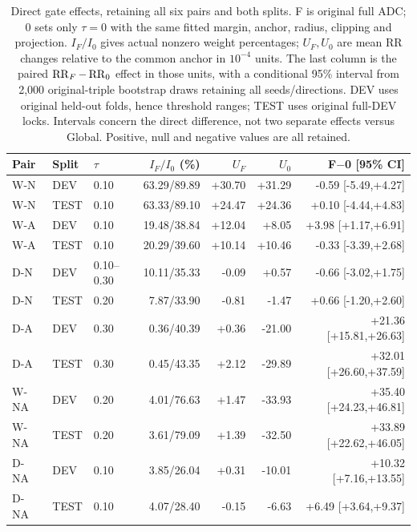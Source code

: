 \begin{table}[htbp]
\centering\footnotesize\setlength{\tabcolsep}{3pt}
\caption{Direct gate effects, retaining all six pairs and both splits. F is original full ADC; 0 sets only $\tau=0$ with the same fitted margin, anchor, radius, clipping and projection. $I_F/I_0$ gives actual nonzero weight percentages; $U_F,U_0$ are mean RR changes relative to the common anchor in $10^{-4}$ units. The last column is the paired $\operatorname{RR}_F-\operatorname{RR}_0$ effect in those units, with a conditional 95\% interval from 2,000 original-triple bootstrap draws retaining all seeds/directions. DEV uses original held-out folds, hence threshold ranges; TEST uses original full-DEV locks. Intervals concern the direct difference, not two separate effects versus Global. Positive, null and negative values are all retained.}
\label{tab:rejection-fallback}
\begin{tabular}{lllrrrr}
\toprule
Pair & Split & $\tau$ & $I_F/I_0$ (\%) & $U_F$ & $U_0$ & F$-$0 [95\% CI]\\
\midrule
W-N & DEV & 0.10 & 63.29/89.89 & +30.70 & +31.29 & -0.59 [-5.49,+4.27]\\
W-N & TEST & 0.10 & 63.33/89.10 & +24.47 & +24.36 & +0.10 [-4.44,+4.83]\\
W-A & DEV & 0.10 & 19.48/38.84 & +12.04 & +8.05 & +3.98 [+1.17,+6.91]\\
W-A & TEST & 0.10 & 20.29/39.60 & +10.14 & +10.46 & -0.33 [-3.39,+2.68]\\
D-N & DEV & 0.10--0.30 & 10.11/35.33 & -0.09 & +0.57 & -0.66 [-3.02,+1.75]\\
D-N & TEST & 0.20 & 7.87/33.90 & -0.81 & -1.47 & +0.66 [-1.20,+2.60]\\
D-A & DEV & 0.30 & 0.36/40.39 & +0.36 & -21.00 & +21.36 [+15.81,+26.63]\\
D-A & TEST & 0.30 & 0.45/43.35 & +2.12 & -29.89 & +32.01 [+26.60,+37.59]\\
W-NA & DEV & 0.20 & 4.01/76.63 & +1.47 & -33.93 & +35.40 [+24.23,+46.81]\\
W-NA & TEST & 0.20 & 3.61/79.09 & +1.39 & -32.50 & +33.89 [+22.62,+46.05]\\
D-NA & DEV & 0.10 & 3.85/26.04 & +0.31 & -10.01 & +10.32 [+7.16,+13.55]\\
D-NA & TEST & 0.10 & 4.07/28.40 & -0.15 & -6.63 & +6.49 [+3.64,+9.37]\\
\bottomrule
\end{tabular}
\end{table}
